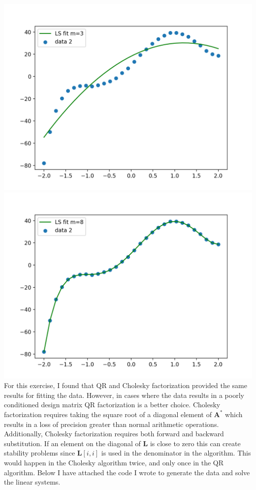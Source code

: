 \documentclass[11pt]{article}
\begin{document}
\begin{enumerate}
\includegraphics[scale=0.5]{data2_m3.png}
\includegraphics[scale=0.5]{data2_m8.png}\\
For this exercise, I found that QR and Cholesky factorization provided the same results for fitting the data. However, in cases where the data results in a poorly conditioned design matrix QR factorization is a better choice. Cholesky factorization requires taking the square root of a diagonal element of $\bm A^{*}$ which results in a loss of precision greater than normal arithmetic operations.  Additionally, Cholesky factorization requires both forward and backward substitution. If an element on the diagonal of $\bm L$ is close to zero this can create stability problems since $\bm L[i,i]$ is used in the denominator in the algorithm. This would happen in the Cholesky algorithm twice, and only once in the QR algorithm. Below I have attached the code I wrote to generate the data and solve the linear systems.
\end{enumerate}
\end{document}
